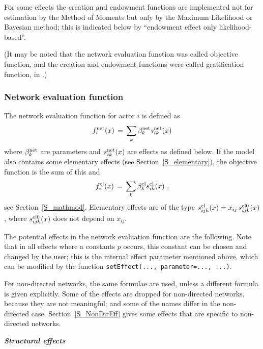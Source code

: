 \documentclass[a4paper,fleqn,11pt]{article}
\newcommand{\+}{\, + \,}
\begin{document}
For some effects
the creation and endowment functions are
implemented not for estimation by the Method of Moments
but only by the Maximum Likelihood or Bayesian method;
this is indicated below by ``endowment effect only likelihood-based''.

(It may be noted that the network evaluation function
was called objective function,
and the creation and endowment functions were called gratification function,
in \citet{Snijders01}.)

\subsubsection{Network evaluation function}
\label{S_f}

The network evaluation function for actor $i$ is defined as
\begin{equation}
f^{\rm net}_i(x) \, = \,
              \sum_k \beta^{\rm net}_k s^{\rm net}_{ik}(x)   \label{f_net}
\end{equation}
where $\beta^{\rm net}_k$ are parameters and $s^{\rm net}_{ik}(x)$
are effects as defined below.
If the model also contains some elementary effects
(see Section~\ref{S_elementary}), the objective
function is the sum of this and
\begin{equation}
f^{\rm el}_i(x) \, = \,
              \sum_k \beta^{\rm el}_k s^{\rm el}_{ik}(x)  \ , \label{f_el_net}
\end{equation}
see Section~\ref{S_mathmod}.
Elementary effects are of the type $s^{\rm el}_{ijk}(x) = x_{ij}\,s^{\rm el0}_{ijk}(x)$,
where $s^{\rm el0}_{ijk}(x)$ does not depend on $x_{ij}$.


The potential effects in the \hypertarget{T_objective}{network
evaluation function}
are the following. Note that in all
effects where a constants $p$ occurs, this constant can be chosen
and changed by the user;
this is the internal effect parameter mentioned above,
which can be modified by the function \texttt{setEffect(..., parameter=..., ...)}.

For non-directed networks, the same formulae are used,
unless a different formula is given explicitly.
Some of the effects are dropped for non-directed networks, because
they are not meaningful; and some of the names differ in the
non-directed case.
Section~\ref{S_NonDirEff} gives some effects that are specific
to non-directed networks.
\medskip

\noindent
\textbf{\emph{Structural effects}}
\medskip
\end{document}
